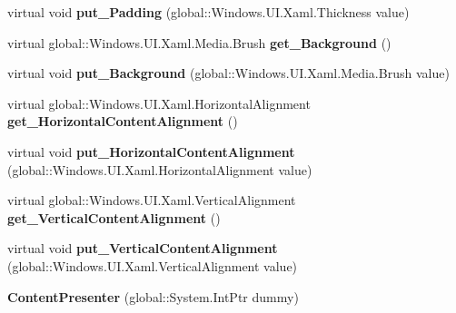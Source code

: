 \begin{DoxyCompactItemize}
virtual void {\bfseries put\+\_\+\+Padding} (global\+::\+Windows.\+U\+I.\+Xaml.\+Thickness value)
\item 
\mbox{\label{class_windows_1_1_u_i_1_1_xaml_1_1_controls_1_1_content_presenter_a9973a77cdfc92b18a4a687327e9c149b}} 
virtual global\+::\+Windows.\+U\+I.\+Xaml.\+Media.\+Brush {\bfseries get\+\_\+\+Background} ()
\item 
\mbox{\label{class_windows_1_1_u_i_1_1_xaml_1_1_controls_1_1_content_presenter_ae714d41e5603173b44adc7fa70273933}} 
virtual void {\bfseries put\+\_\+\+Background} (global\+::\+Windows.\+U\+I.\+Xaml.\+Media.\+Brush value)
\item 
\mbox{\label{class_windows_1_1_u_i_1_1_xaml_1_1_controls_1_1_content_presenter_a7b8ae8a80577e1c215603bbc8edd87ac}} 
virtual global\+::\+Windows.\+U\+I.\+Xaml.\+Horizontal\+Alignment {\bfseries get\+\_\+\+Horizontal\+Content\+Alignment} ()
\item 
\mbox{\label{class_windows_1_1_u_i_1_1_xaml_1_1_controls_1_1_content_presenter_a6e040f832bb892f6df011c71adb2c9b7}} 
virtual void {\bfseries put\+\_\+\+Horizontal\+Content\+Alignment} (global\+::\+Windows.\+U\+I.\+Xaml.\+Horizontal\+Alignment value)
\item 
\mbox{\label{class_windows_1_1_u_i_1_1_xaml_1_1_controls_1_1_content_presenter_a3b6496fc4d34dd5a35e2a4e77e0b0884}} 
virtual global\+::\+Windows.\+U\+I.\+Xaml.\+Vertical\+Alignment {\bfseries get\+\_\+\+Vertical\+Content\+Alignment} ()
\item 
\mbox{\label{class_windows_1_1_u_i_1_1_xaml_1_1_controls_1_1_content_presenter_a9bb6e0ddface2525bafcaff338c4573d}} 
virtual void {\bfseries put\+\_\+\+Vertical\+Content\+Alignment} (global\+::\+Windows.\+U\+I.\+Xaml.\+Vertical\+Alignment value)
\item 
\mbox{\label{class_windows_1_1_u_i_1_1_xaml_1_1_controls_1_1_content_presenter_a1bd0d8cbe62a3644e7315fa42ab2795f}} 
{\bfseries Content\+Presenter} (global\+::\+System.\+Int\+Ptr dummy)
\end{DoxyCompactItemize}
